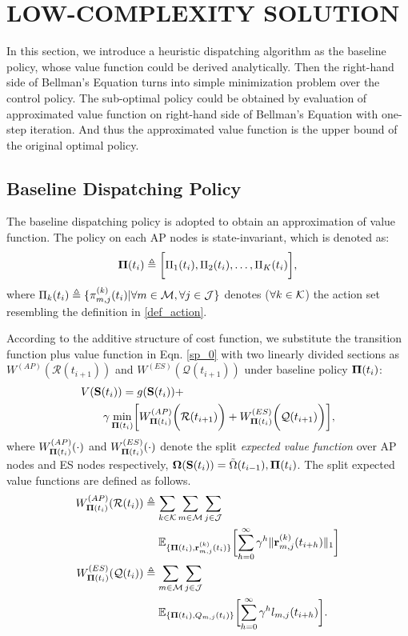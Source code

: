 \section{LOW-COMPLEXITY SOLUTION}
In this section, we introduce a heuristic dispatching algorithm as the baseline policy, whose value function could be derived analytically.
Then the right-hand side of Bellman's Equation turns into simple minimization problem over the control policy. The sub-optimal policy could be obtained by evaluation of approximated value function on right-hand side of Bellman's Equation with one-step iteration. And thus the approximated value function is the upper bound of the original optimal policy.

\subsection{Baseline Dispatching Policy}
The baseline dispatching policy is adopted to obtain an approximation of value function. The policy on each AP nodes is state-invariant, which is denoted as:
\begin{align}
    \boldsymbol{\Pi}(t_i) \triangleq \bigg[\Pi_1(t_i), \Pi_2(t_i), \dots, \Pi_K(t_i)\bigg],
\end{align}
where $\Pi_k(t_i) \triangleq \{\pi^{(k)}_{m,j}(t_{i}) | \forall m\in\mathcal{M},\forall j\in\mathcal{J}\}$ denotes ($\forall k\in\mathcal{K}$) the action set resembling the definition in \ref{def_action}.

According to the additive structure of cost function, we substitute the transition function plus value function in Eqn. \ref{sp_0} with two linearly divided sections as $W^{(AP)}(\mathcal{R}(t_{i+1}))$ and $W^{(ES)}(\mathcal{Q}(t_{i+1}))$ under baseline policy $\boldsymbol{\Pi}(t_{i})$:
\begin{align}
    &V(\Stat(t_{i})) = g(\Stat(t_{i})) +
    \nonumber\\
    &~~~~~~\gamma \min_{\BaseLine(t_i)} \Bracket{ W^{(AP)}_{\BaseLine(t_i)}\Paren{\mathcal{R}(t_{i+1})} + W^{(ES)}_{\BaseLine(t_i)}\Paren{\mathcal{Q}(t_{i+1})} },
\end{align}
where $W^{(AP)}_{\boldsymbol{\Pi}(t_i)}(\cdot)$ and $W^{(ES)}_{\boldsymbol{\Pi}(t_i)}(\cdot)$ denote the split \emph{expected value function} over AP nodes and ES nodes respectively, $\boldsymbol{\Omega}(\mathbf{S}(t_{i})) = \tilde{\Omega}(t_{i-1}), \boldsymbol{\Pi}(t_i)$. The split expected value functions are defined as follows.
\begin{align}
    W^{(AP)}_{\BaseLine(t_i)}(\mathcal{R}(t_{i})) &\define \sum_{k\in\apSet}\sum_{m\in\esSet}\sum_{j\in\jSpace}
        \nonumber\\
        &~~~~\mathbb{E}_{\{\BaseLine(t_i), \vec{r}^{(k)}_{m,j}(t_{i})\}}\Bracket{
            \sum_{h=0}^{\infty} \gamma^{h} \Inorm{\vec{r}^{(k)}_{m,j}(t_{i+h})}
        }
    \\
    W^{(ES)}_{\BaseLine(t_i)}(\mathcal{Q}(t_{i})) &\define \sum_{m\in\esSet}\sum_{j\in\jSpace}
        \nonumber\\
        &~~~~\mathbb{E}_{\{\BaseLine(t_i), Q_{m,j}(t_{i})\}}\Bracket{
            \sum_{h=0}^{\infty} \gamma^{h} l_{m,j}(t_{i+h})
        }.
\end{align}
        
